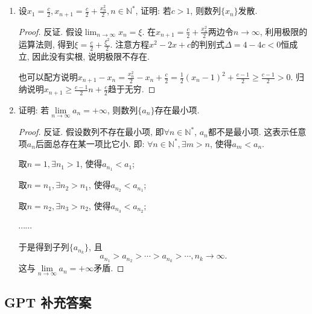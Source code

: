 \documentclass[UTF8,11pt, a4paper, oneside, fontset=none]{ctexbook}
\begin{document}
\begin{enumerate}
\begin{proof}
也可以使用均值不等式:
\[
1 + \frac{x}{2+x}= \frac{2}{\frac{1}{1+x}+1} \leq \sqrt{(1+x) \cdot 1} \leq \frac{1+x +1}{2} = 1 + \frac{x}{2} (x >-1)
\]
因此
\[
\frac{k}{2n^2 +n}\leq \frac{k}{2n^2 +k}= \frac{\frac{k}{n^2}}{2 + \frac{k}{n^2}} \leq \sqrt{1 + \frac{k}{n^2} } -1 \leq \frac{k}{2n^2}.
\]


\end{proof}


\item 设$x_1 = \frac{c}{2}, x_{n+1} = \frac{c}{2} + \frac{x_n^2}{2}, n \in \mathbb N^*$, 证明: 若$c>1$, 则数列$\{x_n \}$发散.

\begin{proof}

反证. 假设$\lim_{n \to \infty}x_n = \xi$. 在$x_{n+1} = \frac{c}{2} + \frac{x_n^2}{2}$两边令$n \to \infty$, 利用极限的运算法则, 得到$\xi = \frac{c}{2} + \frac{\xi^2}{2}$. 注意方程$x^2-2x+c$的判别式$\Delta = 4-4c<0$恒成立, 因此没有实根, 说明极限不存在. 


也可以配方说明$x_{n+1} - x_n = \frac{x_n^2}{2} - x_n + \frac{c}{2}  = \frac{1}{2} (x_n -1)^2 + \frac{c-1}{2} \geq \frac{c-1}{2} >0$. 归纳说明$x_{n+1} \geq \frac{c-1}{2}n + \frac{c}{2} $趋于无穷.

\end{proof}


\item 证明: 若$\lim\limits_{n \to \infty} a_n = +\infty$, 则数列$\{a_n\}$存在最小项.

\begin{proof}

反证. 假设数列不存在最小项, 即$\forall n \in \mathbb N^*$, $a_n$都不是最小项. 这表示任意项$a_n$后面总存在某一项比它小. 即: $\forall n \in \mathbb N^*, \exists m>n$, 使得$a_m < a_n$.

取$n=1, \exists n_1 >1$, 使得$a_{n_1} < a_1$;

取$n=n_1, \exists n_2 >n_1$, 使得$a_{n_2} < a_{n_1}$;

取$n=n_2, \exists n_3 >n_2$, 使得$a_{n_3} < a_{n_2}$;

$\cdots \cdots$

于是得到子列$\{ a_{n_k}\}$, 且
\[
a_{n_1} > a_{n_2} > \cdots > a_{n_k} > \cdots, n_k \to \infty.
\]
这与$\lim\limits_{n \to \infty} a_n = +\infty$矛盾.
\end{proof}
\end{enumerate}

\clearpage

\subsection*{GPT 补充答案}
\end{document}
